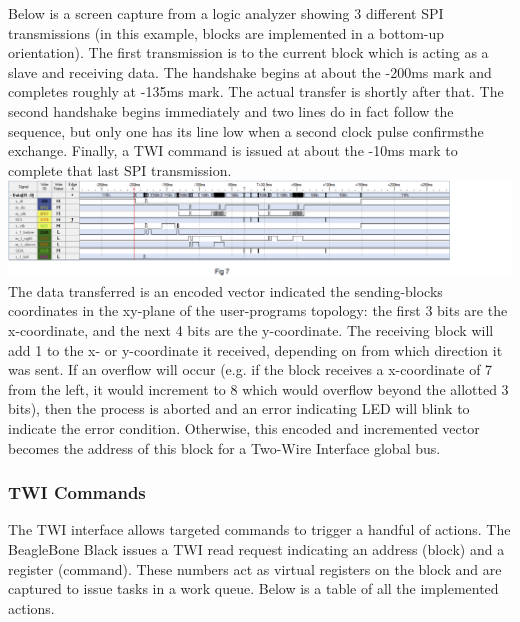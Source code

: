 \documentclass[12pt,a4paper]{article}
\begin{document}
 
 Below is a screen capture from a logic analyzer showing 3 different SPI transmissions (in this example, blocks are implemented in a bottom-up orientation). The first transmission is to the current block which is acting as a slave and receiving data. The handshake begins at about the -200ms mark and completes roughly at -135ms mark. The actual transfer is shortly after that. The second handshake begins immediately and two lines do in fact follow the sequence, but only one has its line low when a second clock pulse \textquotesingle confirms\textquotesingle  the exchange. Finally, a TWI command is issued at about the -10ms mark to complete that last SPI transmission.\\
 
 \includegraphics[width=7in]{RCC.png}
  The data transferred is an encoded vector indicated the sending-block\textquotesingle s coordinates in the xy-plane of the user-program\textquotesingle s topology: the first 3 bits are the x-coordinate, and the next 4 bits are the y-coordinate. The receiving block will add 1 to the x- or y-coordinate it received, depending on from which direction it was sent. If an overflow will occur (e.g. if the block receives a x-coordinate of 7 from the left, it would increment to 8 which would overflow beyond the allotted 3 bits), then the process is aborted and an error indicating LED will blink to indicate the error condition. Otherwise, this encoded and incremented vector becomes the address of this block for a Two-Wire Interface global bus.
  
  \subsubsection{TWI Commands}
  The TWI interface allows targeted commands to trigger a handful of actions. The BeagleBone Black issues a TWI read request indicating an address (block) and a register (command). These numbers act as virtual registers on the block and are captured to issue tasks in a work queue. Below is a table of all the implemented actions. 
  
\end{document}
